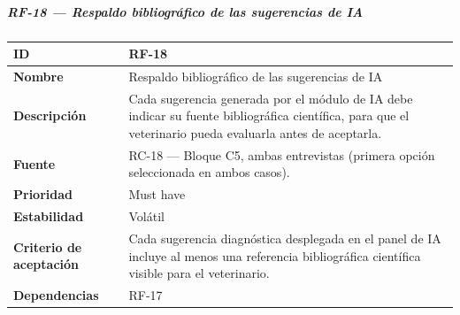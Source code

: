 \documentclass[
]{article}
\newcounter{none} %
\begin{document}
\subparagraph{RF-18 --- Respaldo bibliográfico de las sugerencias de
IA}\label{rf-18-respaldo-bibliogruxe1fico-de-las-sugerencias-de-ia}

{\def\LTcaptype{none} %
\begin{longtable}[]{@{}
  >{\raggedright\arraybackslash}p{}
  >{\raggedright\arraybackslash}p{}@{}}
\toprule\noalign{}
\begin{minipage}[b]{\linewidth}\raggedright
\textbf{ID}
\end{minipage} & \begin{minipage}[b]{\linewidth}\raggedright
RF-18
\end{minipage} \\
\midrule\noalign{}
\endhead
\bottomrule\noalign{}
\endlastfoot
\textbf{Nombre} & \begin{minipage}[t]{\linewidth}\raggedright
Respaldo bibliográfico de las sugerencias de IA
\end{minipage} \\
\textbf{Descripción} & \begin{minipage}[t]{\linewidth}\raggedright
Cada sugerencia generada por el módulo de IA debe indicar su fuente
bibliográfica científica, para que el veterinario pueda evaluarla antes
de aceptarla.
\end{minipage} \\
\textbf{Fuente} & \begin{minipage}[t]{\linewidth}\raggedright
RC-18 --- Bloque C5, ambas entrevistas (primera opción seleccionada en
ambos casos).
\end{minipage} \\
\textbf{Prioridad} & \begin{minipage}[t]{\linewidth}\raggedright
Must have
\end{minipage} \\
\textbf{Estabilidad} & \begin{minipage}[t]{\linewidth}\raggedright
Volátil
\end{minipage} \\
\textbf{Criterio de aceptación} &
\begin{minipage}[t]{\linewidth}\raggedright
Cada sugerencia diagnóstica desplegada en el panel de IA incluye al
menos una referencia bibliográfica científica visible para el
veterinario.
\end{minipage} \\
\textbf{Dependencias} & \begin{minipage}[t]{\linewidth}\raggedright
RF-17
\end{minipage} \\
\end{longtable}
}
\end{document}
